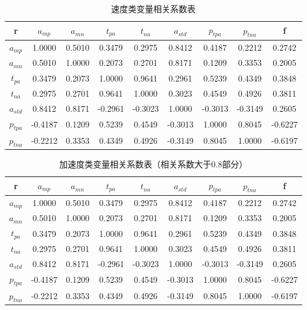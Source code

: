 \documentclass[bwprint]{gmcmthesis}
\begin{document}
\begin{table}[htbp]
\caption{速度类变量相关系数表}
\centering
\begin{tabular}{c c c c c c c c c}%
\hline  %
r & $a_{mp}$ & $a_{mn}$ & $t_{pa}$	& $t_{na}$ & $a_{std}$ & $	p_{tpa}$	& $p_{tna}$	&f\\
\hline
$a_{mp}$	 &1.0000	&0.5010	&0.3479	&0.2975	&0.8412	&0.4187	&0.2212	&0.2742\\
$a_{mn}$ &0.5010	&1.0000	&0.2073	&0.2701	&0.8171	&0.1209	&0.3353	&0.2005\\
$t_{pa} $ &0.3479	&0.2073	&1.0000	&0.9641	&0.2961	&0.5239	&0.4349	&0.3848\\
$t_{na}$ &0.2975	&0.2701	&0.9641	&1.0000	&0.3023	&0.4549	&0.4926	&0.3811\\
$a_{std}$ &0.8412	&0.8171	&-0.2961	&-0.3023	&1.0000	&-0.3013	&-0.3149	&0.2605\\
$p_{tpa}$	 &-0.4187	&0.1209	&0.5239	&0.4549	&-0.3013	&1.0000	&0.8045	&-0.6227\\
$p_{tna}$	 &-0.2212	&0.3353	&0.4349	&0.4926	&-0.3149	&0.8045	&1.0000	&-0.6197\\
\hline  %
\end{tabular}
\end{table}
\begin{table}[htbp]
\caption{加速度类变量相关系数表（相关系数大于0.8部分）}
\centering
\begin{tabular}{c c c c c c c c c}%
\hline  %
r & $a_{mp}$ & $a_{mn}$ & $t_{pa}$	& $t_{na}$ & $a_{std}$ & $	p_{tpa}$	& $p_{tna}$	&f\\
\hline
$a_{mp}$	 &1.0000	&0.5010	&0.3479	&0.2975	&0.8412	&0.4187	&0.2212	&0.2742\\
$a_{mn}$ &0.5010	&1.0000	&0.2073	&0.2701	&0.8171	&0.1209	&0.3353	&0.2005\\
$t_{pa} $ &0.3479	&0.2073	&1.0000	&0.9641	&0.2961	&0.5239	&0.4349	&0.3848\\
$t_{na}$ &0.2975	&0.2701	&0.9641	&1.0000	&0.3023	&0.4549	&0.4926	&0.3811\\
$a_{std}$ &0.8412	&0.8171	&-0.2961	&-0.3023	&1.0000	&-0.3013	&-0.3149	&0.2605\\
$p_{tpa}$	 &-0.4187	&0.1209	&0.5239	&0.4549	&-0.3013	&1.0000	&0.8045	&-0.6227\\
$p_{tna}$	 &-0.2212	&0.3353	&0.4349	&0.4926	&-0.3149	&0.8045	&1.0000	&-0.6197\\
\hline  %
\end{tabular}
\end{table}
\end{document}

